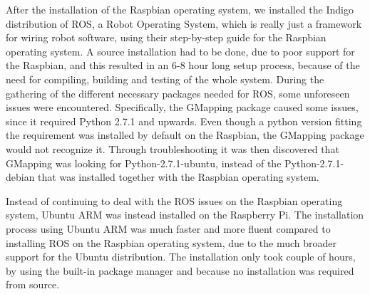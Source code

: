 After the installation of the Raspbian operating system, we installed the Indigo distribution of ROS, a Robot Operating System, which is really just a framework for wiring robot software, using their step-by-step guide for the Raspbian operating system.\cite{indigoins}
A source installation had to be done, due to poor support for the Raspbian, and this resulted in an 6-8 hour long setup process, because of the need for compiling, building and testing of the whole system. 
During the gathering of the different necessary packages needed for ROS, some unforeseen issues were encountered. Specifically, the GMapping package caused some issues, since it required Python 2.7.1 and upwards. Even though a python version fitting the requirement was installed by default on the Raspbian, the GMapping package would not recognize it. Through troubleshooting it was then discovered that GMapping was looking for Python-2.7.1-ubuntu, instead of the Python-2.7.1-debian that was installed together with the Raspbian operating system.

Instead of continuing to deal with the ROS issues on the Raspbian operating system, Ubuntu ARM was instead installed on the Raspberry Pi.\cite{ubuntuins}
The installation process using Ubuntu ARM was much faster and more fluent compared to installing ROS on the Raspbian operating system, due to the much broader support for the Ubuntu distribution. The installation only took couple of hours, by using the built-in package manager and because no installation was required from source.\cite{ubuntuROS}

